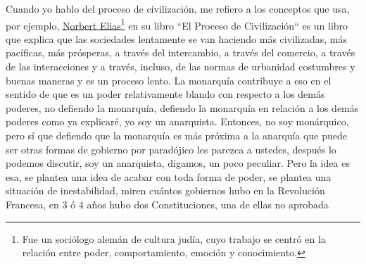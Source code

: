 Cuando yo hablo del proceso de civilización, me refiero a los conceptos que usa, por ejemplo, \href{https://en.wikipedia.org/wiki/Norbert_Elias}{Norbert Elias}\footnote{Fue un sociólogo alemán de cultura judía, cuyo trabajo se centró en la relación entre poder, comportamiento, emoción y conocimiento.} en su libro ``El Proceso de Civilización``\citep{elias1939civilizing} es un libro que explica que las sociedades lentamente se van haciendo más civilizadas, más pacíficas, más prósperas, a través del intercambio, a través del comercio, a través de las interacciones y a través, incluso, de las normas de urbanidad costumbres y buenas maneras y es un proceso lento. La monarquía contribuye a eso en el sentido de que es un poder relativamente blando con respecto a los demás poderes, no defiendo la monarquía, defiendo la monarquía en relación a los demás poderes como ya explicaré, yo soy un anarquista. Entonces, no soy monárquico, pero sí que defiendo que la monarquía es más próxima a la anarquía que puede ser otras formas de gobierno por paradójico les parezca a ustedes, después lo podemos discutir, soy un anarquista, digamos, un poco peculiar. Pero la idea es esa, se plantea una idea de acabar con toda forma de poder, se plantea una situación de inestabilidad, miren cuántos gobiernos hubo en la Revolución Francesa, en 3 ó 4 años hubo dos Constituciones, una de ellas no aprobada
